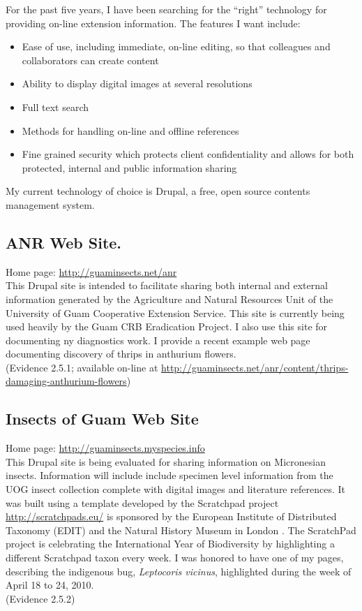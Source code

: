 \documentclass[12pt,oneside,english]{scrbook}
\begin{document}
For the past five years, I have been searching for the ``right''
technology for providing on-line extension information. The features
I want include:
\begin{itemize}
\item Ease of use, including immediate, on-line editing, so that colleagues
and collaborators can create content
\item Ability to display digital images at several resolutions
\item Full text search
\item Methods for handling on-line and offline references
\item Fine grained security which protects client confidentiality and allows
for both protected, internal and public information sharing
\end{itemize}
My current technology of choice is Drupal, a free, open source contents
management system. 

\subsection{ANR Web Site.}

Home page: \url{http://guaminsects.net/anr}\\
This Drupal site is intended to facilitate sharing both internal and
external information generated by the Agriculture and Natural Resources
Unit of the University of Guam Cooperative Extension Service. This
site is currently being used heavily by the Guam CRB Eradication Project.
I also use this site for documenting ny diagnostics work. I provide
a recent example web page documenting discovery of thrips in anthurium
flowers. \\
(Evidence 2.5.1; available on-line at \url{http://guaminsects.net/anr/content/thrips-damaging-anthurium-flowers})

\subsection{Insects of Guam Web Site}

Home page: \url{http://guaminsects.myspecies.info}\textbf{}\\
This Drupal site is being evaluated for sharing information on Micronesian
insects. Information will include include specimen level information
from the UOG insect collection complete with digital images and literature
references. It was built using a template developed by the Scratchpad
project \url{http://scratchpads.eu/} is sponsored by the European
Institute of Distributed Taxonomy (EDIT) and the Natural History Museum
in London . The ScratchPad project is celebrating the International
Year of Biodiversity by highlighting a different Scratchpad taxon
every week. I was honored to have one of my pages, describing the
indigenous bug, \textit{Leptocoris vicinus}, highlighted during the
week of April 18 to 24, 2010.\\
(Evidence 2.5.2)
\end{document}
